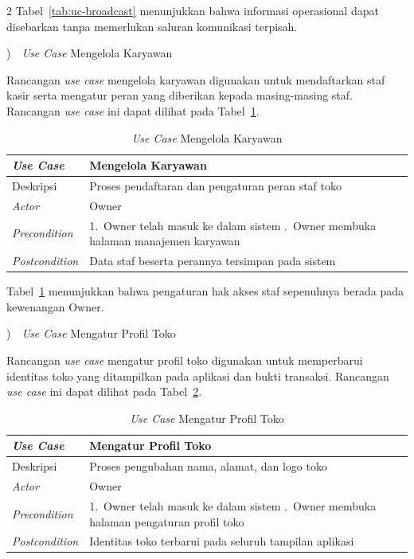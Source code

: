 \documentclass[12pt, a4paper, onecolumn, oneside]{report}
\begin{document}
\begin{spacing}{2}
Tabel~\ref{tab:uc-broadcast} menunjukkan bahwa informasi operasional dapat disebarkan tanpa memerlukan saluran komunikasi terpisah.

)~~\textit{Use Case} Mengelola Karyawan

Rancangan \textit{use case} mengelola karyawan digunakan untuk mendaftarkan staf kasir serta mengatur peran yang diberikan kepada masing-masing staf. Rancangan \textit{use case} ini dapat dilihat pada Tabel~\ref{tab:uc-karyawan}.

\begin{table}[H]
\centering
\caption{\textit{Use Case} Mengelola Karyawan}
\label{tab:uc-karyawan}
\begin{tabularx}{\textwidth}{|p{3.2cm}|X|}
\hline
\textbf{\textit{Use Case}} & \textbf{Mengelola Karyawan} \\ \hline
Deskripsi & Proses pendaftaran dan pengaturan peran staf toko \\ \hline
\textit{Actor} & Owner \\ \hline
\textit{Precondition} & 1.~Owner telah masuk ke dalam sistem \newline 2.~Owner membuka halaman manajemen karyawan \\ \hline
\textit{Postcondition} & Data staf beserta perannya tersimpan pada sistem \\ \hline
\end{tabularx}
\end{table}

Tabel~\ref{tab:uc-karyawan} menunjukkan bahwa pengaturan hak akses staf sepenuhnya berada pada kewenangan Owner.

)~~\textit{Use Case} Mengatur Profil Toko

Rancangan \textit{use case} mengatur profil toko digunakan untuk memperbarui identitas toko yang ditampilkan pada aplikasi dan bukti transaksi. Rancangan \textit{use case} ini dapat dilihat pada Tabel~\ref{tab:uc-profil}.

\begin{table}[H]
\centering
\caption{\textit{Use Case} Mengatur Profil Toko}
\label{tab:uc-profil}
\begin{tabularx}{\textwidth}{|p{3.2cm}|X|}
\hline
\textbf{\textit{Use Case}} & \textbf{Mengatur Profil Toko} \\ \hline
Deskripsi & Proses pengubahan nama, alamat, dan logo toko \\ \hline
\textit{Actor} & Owner \\ \hline
\textit{Precondition} & 1.~Owner telah masuk ke dalam sistem \newline 2.~Owner membuka halaman pengaturan profil toko \\ \hline
\textit{Postcondition} & Identitas toko terbarui pada seluruh tampilan aplikasi \\ \hline
\end{tabularx}
\end{table}


\end{spacing}
\end{document}
